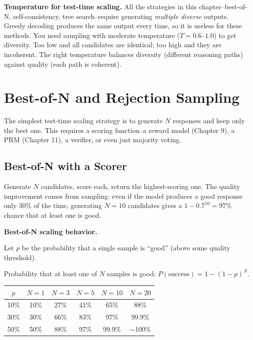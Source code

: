 \begin{chapterenv}
\begin{tipbox}
\textbf{Temperature for test-time scaling.} All the strategies in this chapter--best-of-N, self-consistency, tree search--require generating \textit{multiple diverse} outputs. Greedy decoding produces the same output every time, so it is useless for these methods. You need sampling with moderate temperature ($T = 0.6$--$1.0$) to get diversity. Too low and all candidates are identical; too high and they are incoherent. The right temperature balances diversity (different reasoning paths) against quality (each path is coherent).
\end{tipbox}

\section{Best-of-N and Rejection Sampling}

The simplest test-time scaling strategy is to generate $N$ responses and keep only the best one. This requires a scoring function--a reward model (Chapter 9), a PRM (Chapter 11), a verifier, or even just majority voting.

\subsection{Best-of-N with a Scorer}

Generate $N$ candidates, score each, return the highest-scoring one. The quality improvement comes from sampling: even if the model produces a good response only 30\% of the time, generating $N = 10$ candidates gives a $1 - 0.7^{10} = 97\%$ chance that at least one is good.

\begin{infobox}
\textbf{Best-of-N scaling behavior.}

Let $p$ be the probability that a single sample is ``good'' (above some quality threshold).

Probability that at least one of $N$ samples is good: $P(\text{success}) = 1 - (1-p)^N$.

\begin{tabular}{cccccc}
\toprule
$p$ & $N=1$ & $N=3$ & $N=5$ & $N=10$ & $N=20$ \\
\midrule
10\% & 10\% & 27\% & 41\% & 65\% & 88\% \\
30\% & 30\% & 66\% & 83\% & 97\% & 99.9\% \\
50\% & 50\% & 88\% & 97\% & 99.9\% & $\sim$100\% \\
\bottomrule
\end{tabular}


\end{infobox}
\end{chapterenv}
